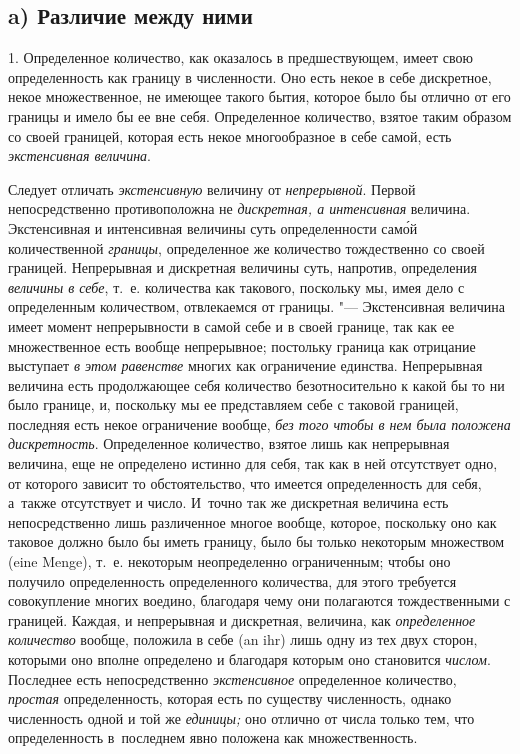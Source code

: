 
\subsection[a) Различие между ними]{a) Различие между ними}

1. Определенное количество, как оказалось в предшествующем, имеет свою
определенность как границу в численности. Оно есть некое в себе дискретное,
некое множественное, не имеющее такого бытия, которое было бы отлично от его
границы и имело бы ее вне себя. Определенное количество, взятое таким образом
со своей границей, которая есть некое многообразное в себе самой, есть
{\em экстенсивная величина}.

Следует отличать {\em экстенсивную} величину от {\em непрерывной}. Первой
непосредственно противоположна не {\em дискретная, а интенсивная}
величина. Экстенсивная и интенсивная величины суть определенности сам\'{о}й
количественной {\em границы}, определенное же количество тождественно со своей
границей. Непрерывная и дискретная величины суть, напротив, определения
{\em величины в себе}, т.~е. количества как такового, поскольку мы, имея дело
с определенным количеством, отвлекаемся от границы. "--- Экстенсивная величина
имеет момент непрерывности в самой себе и в своей границе, так как ее
множественное есть вообще непрерывное; постольку граница как отрицание
выступает {\em в этом равенстве} многих как ограничение единства. Непрерывная
величина есть продолжающее себя количество безотносительно к какой бы то ни
было границе, и, поскольку мы ее представляем себе с таковой границей,
последняя есть некое ограничение вообще, {\em без того чтобы в нем была
положена дискретность}. Определенное количество, взятое лишь как непрерывная
величина, еще не определено истинно для себя, так как в ней отсутствует одно,
от которого зависит то обстоятельство, что имеется определенность для себя,
а~также отсутствует и число. И~точно так же дискретная величина есть
непосредственно лишь различенное многое вообще, которое, поскольку оно как
таковое должно было бы иметь границу, было бы только некоторым множеством (eine
Men\-ge), т.~е. некоторым неопределенно ограниченным; чтобы оно получило
определенность определенного количества, для этого требуется совокупление
многих воедино, благодаря чему они полагаются тождественными с границей.
Каждая, и непрерывная и дискретная, величина, как {\em определенное количество}
вообще, положила в себе (an ihr) лишь одну из тех двух сторон, которыми оно
вполне определено и благодаря которым оно становится {\em числом}. Последнее
есть непосредственно {\em экстенсивное} определенное количество, {\em простая}
определенность, которая есть по существу численность, однако численность одной
и той же {\em единицы;} оно отлично от числа только тем, что определенность
в~последнем явно положена как множественность.

